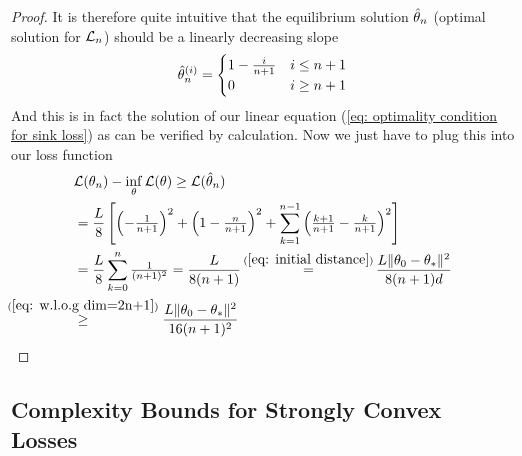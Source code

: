 \begin{proof}
	It is therefore quite intuitive that the equilibrium solution
	\(\hat{\theta}_n\) (optimal solution for \(\mathcal{L}_n\)) should be a linearly
	decreasing slope
	\begin{align*}
		\hat{\theta}_n^{(i)} = \begin{cases}
			1 - \tfrac{i}{n+1} & i \le n+1\\
			0	& i \ge n+1
		\end{cases}
	\end{align*}	
	And this is in fact the solution of our linear equation (\ref{eq: optimality
	condition for sink loss}) as can be verified by calculation. Now we just
	have to plug this into our loss function
	\begin{align*}
		&\Loss(\weights_n)-\inf_\weights\Loss(\weights)
		\ge \Loss(\hat{\weights}_n)\\
		&= \frac{\ubound}{8}\left[
			\left(-\tfrac1{n+1}\right)^2 + \left(1-\tfrac{n}{n+1}\right)^2
			+ \sum_{k=1}^{n-1}\left(\tfrac{k+1}{n+1}-\tfrac{k}{n+1}\right)^2
		\right]\\
		&= \frac{\ubound}{8}\sum_{k=0}^n \tfrac{1}{(n+1)^2}
		=\frac{\ubound}{8(n+1)}
		\xeq{(\ref{eq: initial distance})} \frac{L\|\weights_0 - \minimum\|^2}{8(n+1)d}\\
		&\lxge{(\ref{eq: w.l.o.g dim=2n+1})}
		\frac{L\|\weights_0 - \minimum\|^2}{16(n+1)^2}
		\qedhere
	\end{align*}
\end{proof}

\subsection{Complexity Bounds for Strongly Convex Losses}

